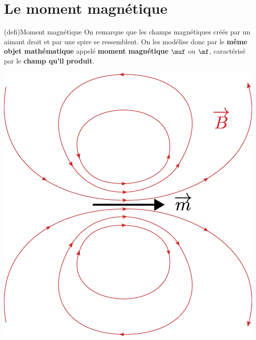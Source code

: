 \documentclass[../../main/main.tex]{subfiles}
\begin{document}
\section{Le moment magnétique}
\label{sec:momag}
\begin{tcb*}[sidebyside, righthand ratio=.2](defi){Moment magnétique}
	On remarque que les champs magnétiques créés par un aimant droit et par une
	spire se ressemblent. On les modélise donc par le \textbf{même objet
		mathématique} appelé \textbf{moment magnétique} $\muf$ ou $\mf$, caractérisé
	par le \textbf{champ qu'il produit}.
	\tcblower
	\begin{center}
		\includegraphics[width=\linewidth]{momag_gen}
	\end{center}
\end{tcb*}
\end{document}

